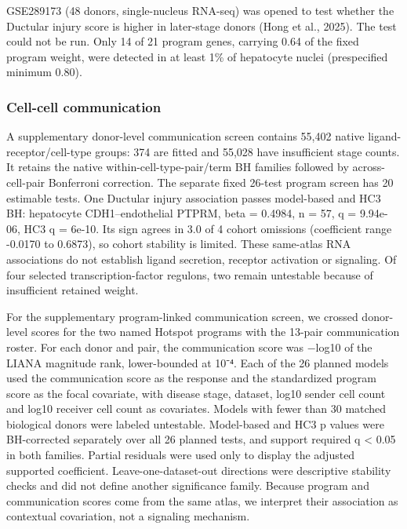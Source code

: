 GSE289173 (48 donors, single-nucleus RNA-seq) was opened to test whether the Ductular injury score is higher in later-stage donors (Hong et al., 2025). The test could not be run. Only 14 of 21 program genes, carrying 0.64 of the fixed program weight, were detected in at least 1\% of hepatocyte nuclei (prespecified minimum 0.80).

\subsubsection{Cell-cell communication}\label{cell-cell-communication}

A supplementary donor-level communication screen contains 55,402 native ligand-receptor/cell-type groups: 374 are fitted and 55,028 have insufficient stage counts. It retains the native within-cell-type-pair/term BH families followed by across-cell-pair Bonferroni correction. The separate fixed 26-test program screen has 20 estimable tests. One Ductular injury association passes model-based and HC3 BH: hepatocyte CDH1--endothelial PTPRM, beta = 0.4984, n = 57, q = 9.94e-06, HC3 q = 6e-10. Its sign agrees in 3.0 of 4 cohort omissions (coefficient range -0.0170 to 0.6873), so cohort stability is limited. These same-atlas RNA associations do not establish ligand secretion, receptor activation or signaling. Of four selected transcription-factor regulons, two remain untestable because of insufficient retained weight.

For the supplementary program-linked communication screen, we crossed donor-level scores for the two named Hotspot programs with the 13-pair communication roster. For each donor and pair, the communication score was −log10 of the LIANA magnitude rank, lower-bounded at 10⁻⁴. Each of the 26 planned models used the communication score as the response and the standardized program score as the focal covariate, with disease stage, dataset, log10 sender cell count and log10 receiver cell count as covariates. Models with fewer than 30 matched biological donors were labeled untestable. Model-based and HC3 p values were BH-corrected separately over all 26 planned tests, and support required q \textless{} 0.05 in both families. Partial residuals were used only to display the adjusted supported coefficient. Leave-one-dataset-out directions were descriptive stability checks and did not define another significance family. Because program and communication scores come from the same atlas, we interpret their association as contextual covariation, not a signaling mechanism.

